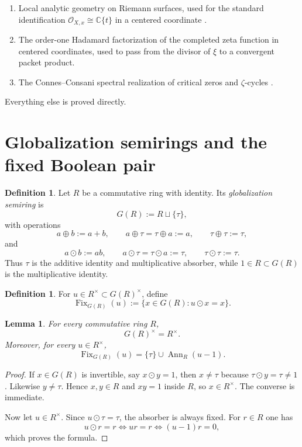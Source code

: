 \documentclass[11pt,a4paper]{article}
\numberwithin{equation}{section}
\newtheorem{lemma}[theorem]{Lemma}
\theoremstyle{definition}
\newtheorem{definition}[theorem]{Definition}
\theoremstyle{remark}
\DeclareMathOperator{\Fix}{Fix}
\DeclareMathOperator{\Ann}{Ann}
\newcommand{\CC}{\mathbb C}
\newcommand{\cO}{\mathcal O}
\newcommand{\taup}{\tau}
\begin{document}
\begin{enumerate}[label=(\roman*)]
\item Local analytic geometry on Riemann surfaces, used for the standard identification $\cO_{X,x}\cong \CC\{t\}$ in a centered coordinate \cite{Lee}.
\item The order-one Hadamard factorization of the completed zeta function in centered coordinates, used to pass from the divisor of $\xi$ to a convergent packet product.
\item The Connes--Consani spectral realization of critical zeros and $\zeta$-cycles \cite{ConnesConsaniCycles}.
\end{enumerate}

Everything else is proved directly.

\section{Globalization semirings and the fixed Boolean pair}

\begin{definition}
Let $R$ be a commutative ring with identity.  Its \emph{globalization semiring} is
\[
G(R):=R\sqcup\{\taup\},
\]
with operations
\[
a\oplus b:=a+b,\qquad a\oplus\taup=\taup\oplus a:=a,\qquad \taup\oplus\taup:=\taup,
\]
and
\[
a\odot b:=ab,\qquad a\odot\taup=\taup\odot a:=\taup,\qquad \taup\odot\taup:=\taup.
\]
Thus $\taup$ is the additive identity and multiplicative absorber, while $1\in R\subset G(R)$ is the multiplicative identity.
\end{definition}

\begin{definition}
For $u\in R^\times\subset G(R)^\times$, define
\[
\Fix_{G(R)}(u):=\{x\in G(R):u\odot x=x\}.
\]
\end{definition}

\begin{lemma}\label{lem:units-fix}
For every commutative ring $R$,
\[
G(R)^\times=R^\times.
\]
Moreover, for every $u\in R^\times$,
\[
\Fix_{G(R)}(u)=\{\taup\}\cup\Ann_R(u-1).
\]
\end{lemma}

\begin{proof}
If $x\in G(R)$ is invertible, say $x\odot y=1$, then $x\neq\taup$ because $\taup\odot y=\taup\neq1$.  Likewise $y\neq\taup$.  Hence $x,y\in R$ and $xy=1$ inside $R$, so $x\in R^\times$.  The converse is immediate.

Now let $u\in R^\times$.  Since $u\odot\taup=\taup$, the absorber is always fixed.  For $r\in R$ one has
\[
u\odot r=r \iff ur=r \iff (u-1)r=0,
\]
which proves the formula.
\end{proof}
\end{document}
